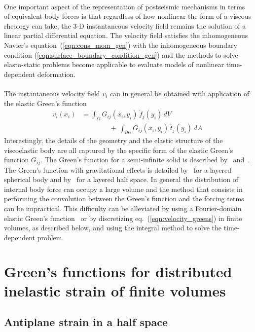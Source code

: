 \documentclass[letterpaper,12pt,]{memoir}
\begin{document}
\\
One important aspect of the representation of postseismic mechanisms in terms of equivalent body forces is that regardless of how nonlinear the form of a viscous rheology can take, the 3-D instantaneous velocity field remains the solution of a linear partial differential equation. The velocity field satisfies the inhomogeneous Navier's equation~(\ref{eqn:cons_mom_gen}) with the inhomogeneous boundary condition (\ref{eqn:surface_boundary_condition_gen}) and the methods to solve elasto-static problems become applicable to evaluate models of nonlinear time-dependent deformation.\\
\\
The instantaneous velocity field $v_i$ can in general be obtained with application of the elastic Green's function
\begin{equation}\label{eqn:velocity_greens}
\begin{aligned}
v_i(x_i)&=\int_{\Omega}G_{ij}(x_i,y_i)\,\dot{f}_j(y_i)\,dV\\
&\qquad\qquad+~\int_{\partial\Omega}G_{ij}(x_i,y_i)\,\dot{t}_j(y_i)\,dA\
\end{aligned}
\end{equation}
Interestingly, the details of the geometry and the elastic structure of the viscoelastic body are all captured by the specific form of the elastic Green's function $G_{ij}$. The Green's function for a semi-infinite solid is described by~\cite{love27} and~\cite{nemat-nasser&hori99}. The Green's function with gravitational effects is detailed by~\cite{pollitz97a} for a layered spherical body and by~\cite{wang+03a} for a layered half space. In general the distribution of internal body force can occupy a large volume and the method that consists in performing the convolution between the Green's function and the forcing terms can be impractical. This difficulty can be alleviated by using a Fourier-domain elastic Green's function~\citep{barbot+09a,barbot+09b} or by discretizing eq.~(\ref{eqn:velocity_greens}) in finite volumes, as described below, and using the integral method to solve the time-dependent problem.


\clearpage
\section{Green's functions for distributed inelastic strain of finite volumes}

\subsection{Antiplane strain in a half space}
\end{document}
